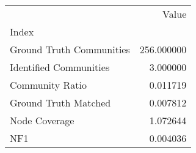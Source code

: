 \begin{tabular}{lr}
\toprule
{} &       Value \\
Index                    &             \\
\midrule
Ground Truth Communities &  256.000000 \\
Identified Communities   &    3.000000 \\
Community Ratio          &    0.011719 \\
Ground Truth Matched     &    0.007812 \\
Node Coverage            &    1.072644 \\
NF1                      &    0.004036 \\
\bottomrule
\end{tabular}
